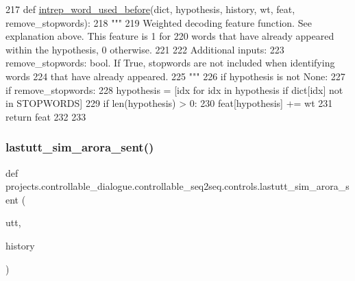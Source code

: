 \begin{DoxyCode}
217 \textcolor{keyword}{def }\hyperlink{namespaceprojects_1_1controllable__dialogue_1_1controllable__seq2seq_1_1controls_a42b08e3d8604f6e0b7d88230323cd777}{intrep\_word\_used\_before}(dict, hypothesis, history, wt, feat, remove\_stopwords):
218     \textcolor{stringliteral}{"""}
219 \textcolor{stringliteral}{    Weighted decoding feature function. See explanation above. This feature is 1 for}
220 \textcolor{stringliteral}{    words that have already appeared within the hypothesis, 0 otherwise.}
221 \textcolor{stringliteral}{}
222 \textcolor{stringliteral}{    Additional inputs:}
223 \textcolor{stringliteral}{      remove\_stopwords: bool. If True, stopwords are not included when identifying words}
224 \textcolor{stringliteral}{        that have already appeared.}
225 \textcolor{stringliteral}{    """}
226     \textcolor{keywordflow}{if} hypothesis \textcolor{keywordflow}{is} \textcolor{keywordflow}{not} \textcolor{keywordtype}{None}:
227         \textcolor{keywordflow}{if} remove\_stopwords:
228             hypothesis = [idx \textcolor{keywordflow}{for} idx \textcolor{keywordflow}{in} hypothesis \textcolor{keywordflow}{if} dict[idx] \textcolor{keywordflow}{not} \textcolor{keywordflow}{in} STOPWORDS]
229         \textcolor{keywordflow}{if} len(hypothesis) > 0:
230             feat[hypothesis] += wt
231     \textcolor{keywordflow}{return} feat
232 
233 
\end{DoxyCode}
\mbox{\label{namespaceprojects_1_1controllable__dialogue_1_1controllable__seq2seq_1_1controls_af87f0a728f9bbb385f160b47ca033c31}} 
\subsubsection{\texorpdfstring{lastutt\+\_\+sim\+\_\+arora\+\_\+sent()}{lastutt\_sim\_arora\_sent()}}
{\footnotesize\ttfamily def projects.\+controllable\+\_\+dialogue.\+controllable\+\_\+seq2seq.\+controls.\+lastutt\+\_\+sim\+\_\+arora\+\_\+sent (\begin{DoxyParamCaption}\item[{}]{utt,  }\item[{}]{history }\end{DoxyParamCaption})}

